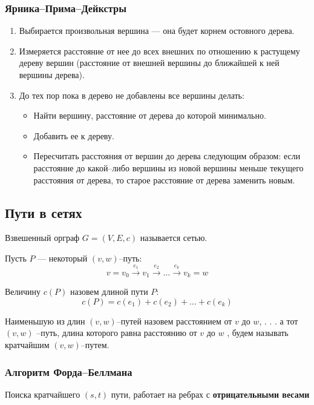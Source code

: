 \subsubsection{Ярника–Прима–Дейкстры}
\begin{enumerate}
	\item Выбирается произвольная вершина — она будет корнем остовного дерева.
	\item Измеряется расстояние от нее до всех внешних по отношению к растущему дереву вершин (расстояние от внешней вершины до ближайшей к ней вершины дерева).
	\item До тех пор пока в дерево не добавлены все вершины делать: \begin{itemize}
		\item Найти вершину, расстояние от дерева до которой минимально.
		\item Добавить ее к дереву.
		\item Пересчитать расстояния от вершин до дерева следующим образом: если расстояние до какой–либо вершины из новой вершины меньше текущего расстояния от дерева, то старое расстояние от дерева заменить новым.
	\end{itemize}
\end{enumerate}

\subsection{Пути в сетях}

Взвешенный орграф $G = (V , E , c )$ называется сетью. 

Пусть $P$ — некоторый $(v,w)$–путь:
\begin{equation}
	v = v_0 \xrightarrow{e_1} v_1 \xrightarrow{e_2} \dots \xrightarrow{e_k} v_k = w
\end{equation}

Величину $c(P)$ назовем длиной пути $P$:
\begin{equation}
	c (P ) = c (e_1 ) + c (e_2 ) + \dots + c (e_k )
\end{equation}

Наименьшую из длин $(v,w)$–путей назовем расстоянием от $v$ до $w$, 
. . . а тот $(v , w )$ –путь, длина которого равна расстоянию от $v$ до $w$ , будем называть кратчайшим $(v,w)$–путем.

\subsubsection{Алгоритм Форда–Беллмана}
Поиска кратчайшего $(s,t)$ пути, работает на ребрах с \textbf{отрицательными весами}

